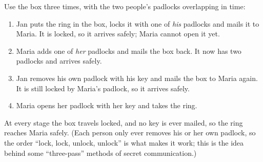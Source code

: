 Use the box three times, with the two people's padlocks overlapping in time:
\begin{enumerate}
\item[1.] Jan puts the ring in the box, locks it with one of \emph{his} padlocks and mails it to Maria. It is locked, so it arrives safely; Maria cannot open it yet.
\item[2.] Maria adds one of \emph{her} padlocks and mails the box back. It now has two padlocks and arrives safely.
\item[3.] Jan removes his own padlock with his key and mails the box to Maria again. It is still locked by Maria's padlock, so it arrives safely.
\item[4.] Maria opens her padlock with her key and takes the ring.
\end{enumerate}
At every stage the box travels locked, and no key is ever mailed, so the ring reaches Maria safely. (Each person only ever removes his or her own padlock, so the order ``lock, lock, unlock, unlock'' is what makes it work; this is the idea behind some ``three-pass'' methods of secret communication.)
